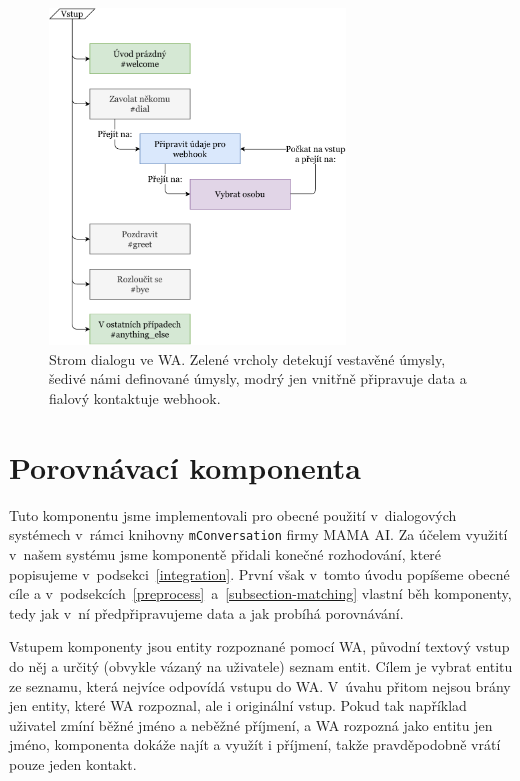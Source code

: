 \begin{figure}[h]
    \centering
    \includegraphics[width=0.7\textwidth]{../img/wa-tree.pdf}
    \caption{Strom dialogu ve WA. Zelené vrcholy detekují vestavěné úmysly,
        šedivé námi definované úmysly, modrý jen vnitřně připravuje data a fialový
        kontaktuje webhook.}\label{img-wa-tree}
\end{figure}

\section{Porovnávací komponenta}\label{matching}

Tuto komponentu jsme implementovali pro obecné použití v~dialogových systémech
v~rámci knihovny \texttt{mConversation} firmy MAMA AI. Za účelem využití v~našem
systému jsme komponentě přidali konečné rozhodování, které popisujeme v~podsekci~\ref{integration}.
První však v~tomto úvodu popíšeme obecné cíle a v~podsekcích~\ref{preprocess}~a~\ref{subsection-matching}
vlastní běh komponenty, tedy jak v~ní předpřipravujeme data a jak probíhá porovnávání.

Vstupem komponenty jsou entity rozpoznané pomocí WA, původní textový vstup do něj
a určitý (obvykle vázaný na uživatele) seznam entit. Cílem je vybrat entitu ze seznamu,
která nejvíce odpovídá vstupu do WA. V~úvahu přitom nejsou brány jen entity, které
WA rozpoznal, ale i originální vstup. Pokud tak například uživatel zmíní běžné jméno a
neběžné příjmení, a WA rozpozná jako entitu jen jméno, komponenta dokáže najít a využít
i příjmení, takže pravděpodobně vrátí pouze jeden kontakt.

